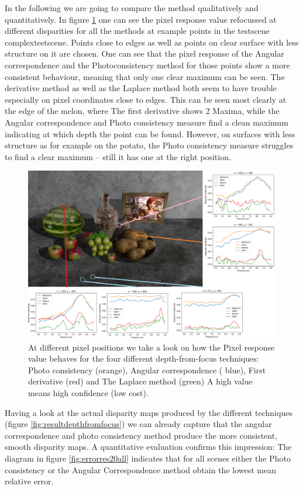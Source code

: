 \documentclass  [
  paper    = a4,
  BCOR     = 10mm,
  twoside,
  fontsize = 12pt,
  fleqn,
  toc      = bibnumbered,
  toc      = listofnumbered,
  numbers  = noendperiod,
  headings = normal,
  listof   = leveldown,
  version  = 3.03
]                                       {scrreprt}
\begin{document}
	In the following we are going to compare the method qualitatively and quantitatively. In figure \ref{fig:originalmarked} one can see the pixel response value refocussed at different disparities for all the methods at example points in the testscene \glqq complextestscene\grqq. Points close to edges as well as points on clear surface with less structure on it are chosen. One can see that the pixel response of the Angular correspondence and the Photoconsistency method for those points show a more consistent behaviour, meaning that only one clear maximum can be seen. The derivative method as well as the Laplace method both seem to have trouble especially on pixel coordinates close to edges. This can be seen most clearly at the edge of the melon, where The first derivative shows 2 Maxima, while the Angular correspondence and Photo consistency measure find a clean maximum indicating at which depth the point can be found. However, on surfaces with less structure as for example on the potato, the Photo consistency measure struggles to find a clear maximum -- still it has one at the right position. 
	\begin{figure}
		\centering
		\includegraphics[width=1\linewidth]{images/original_marked}
		\caption[Pixel response for depth from focus techniques]{At different pixel positions we take a look on how the Pixel response value behaves for the four different depth-from-focus techniques: Photo consistency (orange), Angular correspondence ( blue), First derivative (red) and The Laplace method (green) A high value means high confidence (low cost).}
		\label{fig:originalmarked}
	\end{figure}
	Having a look at the actual disparity maps produced by the different techniques (figure \ref{fig:resultdepthfromfocus}) we can already capture that the angular correspondence and photo consistency method produce the more consistent, smooth disparity maps. A quantitative evaluation confirms this impression:
	The diagram in figure \ref{fig:errorres20all} indicates that for all scenes either the Photo consistency or the Angular Correspondence method obtain the lowest mean relative error.
	
\end{document}
